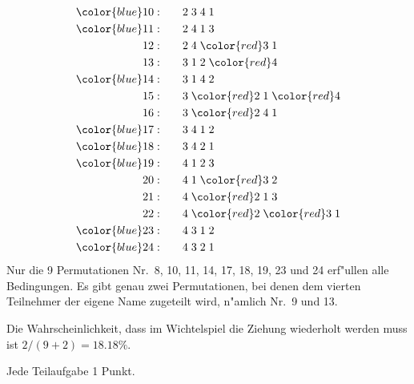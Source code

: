\begin{loesung}
\begin{teilaufgaben}
\begin{align*}
{\color{blue}
10:}\qquad&            2 \;            3 \;            4 \;            1 \\
{\color{blue}
11:}\qquad&            2 \;            4 \;            1 \;            3 \\
12: \qquad&            2 \;            4 \;{\color{red}3}\;            1 \\
%
13: \qquad&            3 \;            1 \;            2 \;{\color{red}4}\\
{\color{blue}
14:}\qquad&            3 \;            1 \;            4 \;            2 \\
15: \qquad&            3 \;{\color{red}2}\;            1 \;{\color{red}4}\\
16: \qquad&            3 \;{\color{red}2}\;            4 \;            1 \\
{\color{blue}
17:}\qquad&            3 \;            4 \;            1 \;            2 \\
{\color{blue}
18:}\qquad&            3 \;            4 \;            2 \;            1 \\
%
{\color{blue}
19:}\qquad&            4 \;            1 \;            2 \;            3 \\
20: \qquad&            4 \;            1 \;{\color{red}3}\;            2 \\
21: \qquad&            4 \;{\color{red}2}\;            1 \;            3 \\
22: \qquad&            4 \;{\color{red}2}\;{\color{red}3}\;            1 \\
{\color{blue}
23:}\qquad&            4 \;            3 \;            1 \;            2 \\
{\color{blue}
24:}\qquad&            4 \;            3 \;            2 \;            1
\end{align*}
Nur die 9 Permutationen Nr.~{\color{blue}8},
{\color{blue}10},
{\color{blue}11},
{\color{blue}14},
{\color{blue}17},
{\color{blue}18},
{\color{blue}19},
{\color{blue}23} und
{\color{blue}24} erf"ullen
alle Bedingungen.
Es gibt genau zwei Permutationen, bei denen dem vierten Teilnehmer der
eigene Name zugeteilt wird, n"amlich Nr.~{\color{blue}9} und {\color{blue}13}.
\item
Die Wahrscheinlichkeit, dass im Wichtelspiel die Ziehung wiederholt 
werden muss ist $2/(9 + 2)=18.18\%$.
\qedhere
\end{teilaufgaben}
\end{loesung}

\begin{bewertung}
Jede Teilaufgabe 1 Punkt.
\end{bewertung}

